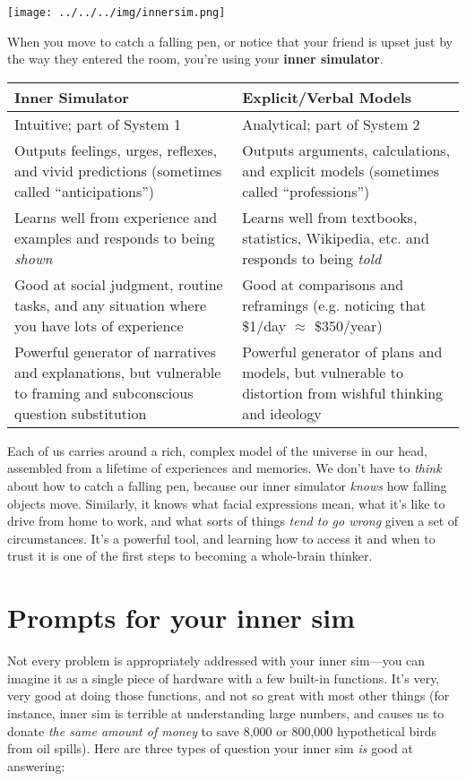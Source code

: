 \setlength{\parindent}{0em}
\texttt{[image: ../../../img/innersim.png]}

When you move to catch a falling pen, or notice that your friend is upset just by the way they entered the room, you're using your \textbf{inner simulator}.
\begin{center}
	\begin{tabular}{ | p{} | p{} | }
		\hline
		\textbf{Inner Simulator} & \textbf{Explicit/Verbal Models} \\ \hline
		Intuitive; part of System 1 & Analytical; part of System 2 \\ \hline
		Outputs feelings, urges, reflexes, and vivid predictions (sometimes called ``anticipations'') & Outputs arguments, calculations, and explicit models (sometimes called ``professions'') \\ \hline
		Learns well from experience and examples and responds to being \emph{shown} & Learns well from textbooks, statistics, Wikipedia, etc. and responds to being \emph{told} \\ \hline
		Good at social judgment, routine tasks, and any situation where you have lots of experience & Good at comparisons and reframings (e.g. noticing that \$1/day $\approx$ \$350/year) \\ \hline
		Powerful generator of narratives and explanations, but vulnerable to framing and subconscious question substitution & Powerful generator of plans and models, but vulnerable to distortion from wishful thinking and ideology \\ \hline
	 \end{tabular}
 \end{center}

\setlength{\parindent}{1.5em}
Each of us carries around a rich, complex model of the universe in our head, assembled from a lifetime of experiences and memories.  We don't have to \emph{think} about how to catch a falling pen, because our inner simulator \emph{knows} how falling objects move.  Similarly, it knows what facial expressions mean, what it's like to drive from home to work, and what sorts of things \emph{tend to go wrong} given a set of circumstances.  It's a powerful tool, and learning how to access it and when to trust it is one of the first steps to becoming a whole-brain thinker.

\section*{Prompts for your inner sim}
\setlength{\parindent}{0em}
Not every problem is appropriately addressed with your inner sim---you can imagine it as a single piece of hardware with a few built-in functions.  It's very, very good at doing those functions, and not so great with most other things (for instance, inner sim is terrible at understanding large numbers, and causes us to donate \emph{the same amount of money} to save 8,000 or 800,000 hypothetical birds from oil spills).  Here are three types of question your inner sim \emph{is} good at answering:

